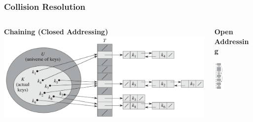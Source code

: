 \documentclass[UTF8,11pt]{beamer}
\begin{document}
\begin{frame}
\frametitle{Collision Resolution}
\begin{columns}
	\begin{column}{0.6\textwidth}
		\begin{center}
			\begin{block}{\textbf{Chaining (Closed Addressing)}}
				\includegraphics[width=\textwidth]{figs/cr_chaining.png}
			\end{block}
		\end{center}
	\end{column}
	\begin{column}{0.35\textwidth}
		
			\begin{block}{\textbf{Open Addressing}}
				\begin{center}
				\includegraphics[width=0.25\textwidth]{figs/cr_open_addressing.png}
				
				\end{center}
			\end{block}
	\end{column}
\end{columns}
\end{frame}
\end{document}
